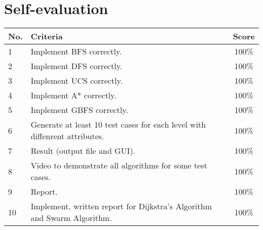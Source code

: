 \pagebreak
\section{Self-evaluation}
\begin{center}
  \renewcommand{\arraystretch}{1.5}
  \begin{tabular}{|l|p{}|c|}
    \hline
    \textbf{No.} & \textbf{Criteria}           & \textbf{Score} \\ \hline
    1            & Implement BFS correctly.             & 100\%          \\ \hline
    2            & Implement DFS correctly.         & 100\%          \\ \hline
    3            & Implement UCS correctly. & 100\%          \\ \hline
    4            & Implement A* correctly.    & 100\%          \\ \hline
	5			 & Implement GBFS correctly.    & 100\%          \\ \hline
    6            & Generate at least 10 test cases for each level with diffenrent attributes.             & 100\%          \\ \hline
    7            & Result (output file and GUI).                & 100\%          \\ \hline
    8            & Video to demonstrate all algorithms for some test cases.                   & 100\%          \\ \hline
	9            & Report.                    & 100\%          \\ \hline
	10			 & Implement, written report for Dijkstra's Algorithm and Swarm Algorithm.             & 100\%          \\ \hline
  \end{tabular}
\end{center}